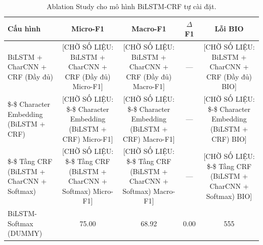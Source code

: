 \begin{table}[t]
\centering
\small
\begin{tabular}{lcccc}
\hline
\textbf{Cấu hình} & \textbf{Micro-F1} & \textbf{Macro-F1} & \textbf{$\Delta$F1} & \textbf{Lỗi BIO} \\
\hline
BiLSTM + CharCNN + CRF (Đầy đủ) & [CHỜ SỐ LIỆU: BiLSTM + CharCNN + CRF (Đầy đủ) Micro-F1] & [CHỜ SỐ LIỆU: BiLSTM + CharCNN + CRF (Đầy đủ) Macro-F1] & — & [CHỜ SỐ LIỆU: BiLSTM + CharCNN + CRF (Đầy đủ) BIO] \\
  \$-\$ Character Embedding (BiLSTM + CRF) & [CHỜ SỐ LIỆU:   \$-\$ Character Embedding (BiLSTM + CRF) Micro-F1] & [CHỜ SỐ LIỆU:   \$-\$ Character Embedding (BiLSTM + CRF) Macro-F1] & — & [CHỜ SỐ LIỆU:   \$-\$ Character Embedding (BiLSTM + CRF) BIO] \\
  \$-\$ Tầng CRF (BiLSTM + CharCNN + Softmax) & [CHỜ SỐ LIỆU:   \$-\$ Tầng CRF (BiLSTM + CharCNN + Softmax) Micro-F1] & [CHỜ SỐ LIỆU:   \$-\$ Tầng CRF (BiLSTM + CharCNN + Softmax) Macro-F1] & — & [CHỜ SỐ LIỆU:   \$-\$ Tầng CRF (BiLSTM + CharCNN + Softmax) BIO] \\
BiLSTM-Softmax (DUMMY) & 75.00 & 68.92 & 0.00 & 555 \\
\hline
\end{tabular}
\caption{Ablation Study cho mô hình BiLSTM-CRF tự cài đặt.}
\label{tab:ablation_bilstm}
\end{table}
